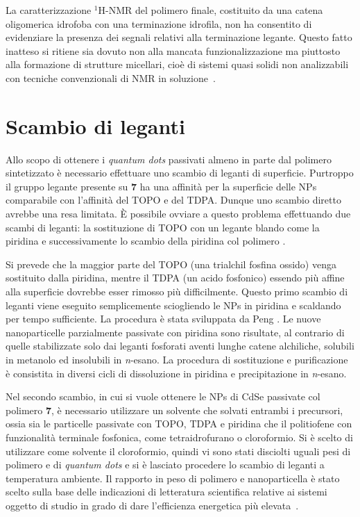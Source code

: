 La caratterizzazione $^1$H-NMR del polimero finale, costituito da una catena oligomerica idrofoba con una 
terminazione idrofila, non ha consentito di evidenziare la presenza dei segnali relativi alla terminazione legante. Questo fatto inatteso si ritiene sia dovuto non alla mancata funzionalizzazione ma piuttosto alla formazione di strutture micellari, cioè di sistemi quasi solidi non analizzabili con tecniche convenzionali di NMR in soluzione~\cite{lig-micelle-nmr2}. 

\section{Scambio di leganti}
\label{sec:leganti}
Allo scopo di ottenere i \emph{quantum dots} passivati almeno in parte dal polimero sintetizzato  è necessario effettuare uno scambio di leganti di superficie. Purtroppo il gruppo legante presente su {\bf 7} ha una affinità per la superficie delle NPs comparabile con l'affinità del TOPO e del TDPA\@. Dunque uno scambio diretto avrebbe una resa limitata. È possibile ovviare a questo problema effettuando due scambi di leganti: la sostituzione di TOPO con un legante blando come la piridina e successivamente lo scambio della piridina col polimero .

 Si prevede che la maggior parte del TOPO (una trialchil fosfina ossido) venga sostituito dalla piridina, mentre il TDPA (un acido fosfonico) essendo più affine alla superficie \cite{lig-CdSe-P} dovrebbe esser rimosso più difficilmente. 
Questo primo scambio di leganti viene eseguito semplicemente sciogliendo le NPs in piridina e scaldando per tempo sufficiente. La procedura è stata sviluppata da Peng \etal \cite{lig-pyridine}. Le nuove nanoparticelle parzialmente passivate con piridina sono risultate, al contrario di quelle stabilizzate solo dai leganti fosforati aventi lunghe catene alchiliche, solubili in metanolo ed insolubili in {\itshape n}-esano. La procedura di sostituzione e purificazione è consistita in diversi cicli di dissoluzione in piridina e precipitazione in {\itshape n}-esano.

Nel secondo scambio, in cui si vuole ottenere le NPs di CdSe passivate col polimero {\bf 7}, è necessario utilizzare un solvente che solvati entrambi i precursori, ossia sia le particelle passivate con TOPO, TDPA e piridina che il politiofene con funzionalità terminale fosfonica, come tetraidrofurano o cloroformio. Si è scelto di utilizzare come solvente il cloroformio, quindi vi sono stati disciolti uguali pesi di polimero e di \emph{quantum dots} e si è lasciato procedere lo scambio di leganti a temperatura ambiente. Il rapporto in peso di polimero e nanoparticella è stato scelto sulla base delle indicazioni di letteratura scientifica relative ai sistemi oggetto di studio in grado di dare l'efficienza energetica più elevata~\cite{qd-ratio-CdSe_vs_pol}.


